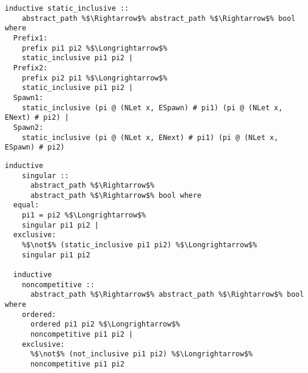 \documentclass{article}
\begin{document}
\begin{lstlisting}[style=codestyle1, escapechar=\%]
  inductive static_inclusive ::
    abstract_path %$\Rightarrow$% abstract_path %$\Rightarrow$% bool where
  Prefix1:
    prefix pi1 pi2 %$\Longrightarrow$%
    static_inclusive pi1 pi2 |
  Prefix2:
    prefix pi2 pi1 %$\Longrightarrow$%
    static_inclusive pi1 pi2 |
  Spawn1:
    static_inclusive (pi @ (NLet x, ESpawn) # pi1) (pi @ (NLet x, ENext) # pi2) |
  Spawn2:
    static_inclusive (pi @ (NLet x, ENext) # pi1) (pi @ (NLet x, ESpawn) # pi2)
  \end{lstlisting}

\begin{lstlisting}[style=codestyle1, escapechar=\%]
  inductive
    singular ::
      abstract_path %$\Rightarrow$%
      abstract_path %$\Rightarrow$% bool where
  equal:
    pi1 = pi2 %$\Longrightarrow$% 
    singular pi1 pi2 |
  exclusive:
    %$\not$% (static_inclusive pi1 pi2) %$\Longrightarrow$% 
    singular pi1 pi2

  inductive
    noncompetitive ::
      abstract_path %$\Rightarrow$% abstract_path %$\Rightarrow$% bool where
    ordered:
      ordered pi1 pi2 %$\Longrightarrow$% 
      noncompetitive pi1 pi2 |
    exclusive:
      %$\not$% (not_inclusive pi1 pi2) %$\Longrightarrow$% 
      noncompetitive pi1 pi2
  \end{lstlisting}
\end{document}
